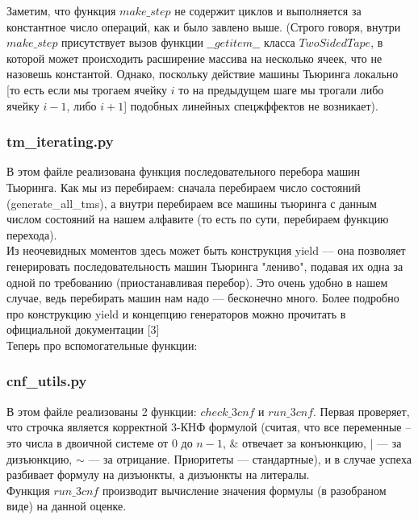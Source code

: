 \documentclass[paper=a4, fontsize=11pt]{scrartcl}
\begin{document}
Заметим, что функция $make\_step$ не содержит циклов и выполняется за константное
число операций, как и было завлено выше. (Строго говоря, внутри $make\_step$
присутствует вызов функции $\_\_getitem\_\_$ класса $TwoSidedTape$, в которой
может происходить расширение массива на несколько ячеек, что не назовешь
константой. Однако, поскольку действие машины Тьюринга локально [то есть если
мы трогаем ячейку $i$ то на предыдущем шаге мы трогали либо ячейку
$i - 1$, либо $i + 1$] подобных линейных спецжффектов не возникает).\\

\subsubsection{tm\_iterating.py}

В этом файле реализована функция последовательного перебора машин Тьюринга.
Как мы из перебираем: сначала перебираем число состояний (generate\_all\_tms), а
внутри перебираем все машины тьюринга с данным числом состояний на нашем
алфавите (то есть по сути, перебираем функцию перехода).\\

Из неочевидных моментов здесь может быть конструкция yield --- она позволяет
генерировать последовательность машин Тьюринга "лениво", подавая их одна за
одной по требованию (приостанавливая перебор). Это очень удобно в нашем случае,
ведь перебирать машин нам надо --- бесконечно много.
Более подробно про конструкцию yield и концепцию генераторов можно прочитать
в официальной документации [3] \\


Теперь про вспомогательные функции:\\

\subsubsection{cnf\_utils.py}

В этом файле реализованы 2 функции: $check\_3cnf$ и $run\_3cnf$.
Первая проверяет,
что строчка является корректной 3-КНФ формулой
(считая, что все переменные -- это числа в двоичной системе от 0 до $n - 1$, \&
отвечает за конъюнкцию, $|$ --- за дизъюнкцию, $\sim$ --- за отрицание.
Приоритеты --- стандартные), и в случае успеха разбивает формулу на дизъюнкты,
а дизъюнкты на литералы.\\

Функция $run\_3cnf$ производит вычисление значения формулы (в разобраном виде) на
данной оценке.\\
\end{document}
